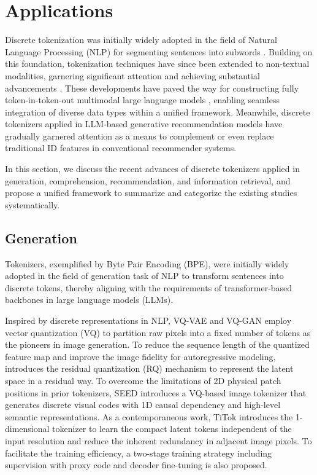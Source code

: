 \section{Applications} \label{sec:application}


Discrete tokenization was initially widely adopted in the field of Natural Language Processing (NLP) for segmenting sentences into subwords \cite{bpe2016,wu2016google,kudo2018sentencepiece}. Building on this foundation, tokenization techniques have since been extended to non-textual modalities, garnering significant attention and achieving substantial advancements \cite{team2024chameleon,xie2024show,chen2025janus}. These developments have paved the way for constructing fully token-in-token-out multimodal large language models \cite{yin2023survey}, enabling seamless integration of diverse data types within a unified framework. 
Meanwhile, discrete tokenizers applied in LLM-based generative recommendation models \cite{li2023large} have gradually garnered attention as a means to complement or even replace traditional ID features in conventional recommender systems.

In this section, we discuss the recent advances of discrete tokenizers applied in generation, comprehension, recommendation, and information retrieval, and propose a unified framework to summarize and categorize the existing studies systematically.



\subsection{Generation}


Tokenizers, exemplified by Byte Pair Encoding (BPE), were initially widely adopted in the field of generation task of NLP to transform sentences into discrete tokens, thereby aligning with the requirements of transformer-based backbones in large language models (LLMs).

Inspired by discrete representations in NLP, VQ-VAE \cite{van2017vqvae} and VQ-GAN \cite{esser2021vqgan} employ vector quantization (VQ) to partition raw pixels into a fixed number of tokens as the pioneers in image generation. To reduce the sequence length of the quantized feature map and improve the image fidelity for autoregressive modeling, \cite{lee2022rqvae} introduces the residual quantization (RQ) mechanism \cite{juang1982multiple} to represent the latent space in a residual way. 
To overcome the limitations of 2D physical patch positions in prior tokenizers, SEED \cite{ge2023planting} introduces a VQ-based image tokenizer that generates discrete visual codes with 1D causal dependency and high-level semantic representations.
As a contemporaneous work, TiTok \cite{yu2024titok} introduces the 1-dimensional tokenizer to learn the compact latent tokens independent of the input resolution and reduce the inherent redundancy in adjacent image pixels. To facilitate the training efficiency, a two-stage training strategy including supervision with proxy code and decoder fine-tuning is also proposed. 


